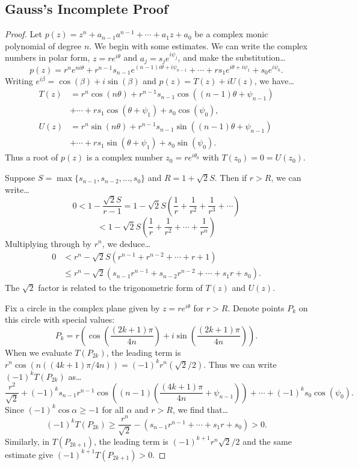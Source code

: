 \subsection{Gauss's Incomplete Proof}\label{gaussproofofFOA}

\begin{proof}
Let $p(z) = z^n + a_{n-1}a^{n-1} + \cdots + a_1z + a_0$ be a complex monic polynomial of degree $n$. We begin with some
estimates. We can write the complex numbers in polar form, $z = re^{i \theta}$ and $a_j = s_je^{i \psi_j}$, and make the substitution\dots
$$p(z) = r^ne^{ni \theta} + r^{n-1}s_{n-1}e^{(n-1)i \theta + i \psi_{n-1}} + \cdots + rs_1e^{i \theta + i \psi_1} + s_0e^{i \psi_0}.$$
Writing $e^{i \beta} = \cos(\beta) + i \sin(\beta)$ and $p(z) = T(z) + i U(z)$, we have\dots
\begin{align*}
T(z) &= r^n \cos(n \theta) + r^{n-1}s_{n-1} \cos((n-1)\theta + \psi_{n-1})\\
	 &+ \cdots + rs_1 \cos(\theta + \psi_1) + s_0 \cos (\psi_0),\\
U(z) &= r^n \sin(n \theta) + r^{n-1}s_{n-1} \sin((n-1)\theta + \psi_{n-1})\\
	 &+ \cdots + rs_1\sin(\theta + \psi_1) + s_0 \sin(\psi_0).
\end{align*}
Thus a root of $p(z)$ is a complex number $z_0 = re^{i\theta_0}$ with $T(z_0) = 0 = U(z_0)$.

Suppose $S = \max \{ s_{n-1}, s_{n-2}, \dots, s_0\}$ and $R = 1 + \sqrt{2}S$. Then if $r > R$, we can write\dots
$$0 < 1 - \frac{\sqrt{2}S}{r-1} = 1 -\sqrt{2}S\left(\frac{1}{r} + \frac{1}{r^2} + \frac{1}{r^3} + \cdots\right)$$
$$< 1 - \sqrt{2}S\left(\frac{1}{r} + \frac{1}{r^2} + \cdots + \frac{1}{r^n}\right)$$
Multiplying through by $r^n$, we deduce\dots
\begin{align*}
0 &< r^n - \sqrt{2}S(r^{n-1} + r^{n-2} + \cdots + r + 1)\\
  &\leq r^n - \sqrt{2}(s_{n-1}r^{n-1} + s_{n-2}r^{n-2} + \cdots + s_1r + s_0).
\end{align*}
The $\sqrt{2}$ factor is related to the trigonometric form of $T(z)$ and $U(z)$.

Fix a circle in the complex plane given by $z = re^{i \theta}$ for $r > R$. Denote points $P_k$ on this circle with special values:
$$P_k = r \left( \cos\left( \frac{(2k + 1) \pi}{4n}\right) + i \sin \left( \frac{(2k + 1) \pi}{4n} \right) \right).$$
When we evaluate $T(P_{2k})$, the leading term is $r^n \cos(n((4k+1)\pi/4n)) = (-1)^kr^n(\sqrt{2}/2)$. Thus we can write $(-1)^k T(P_{2k})$ as\dots
$$\frac{r^2}{\sqrt{2}} + (-1)^k s_{n-1} r^{n-1} \cos \left( (n-1) \left( \frac{(4k + 1)\pi}{4n} + \psi_{n-1} \right) \right) + \cdots + (-1)^ks_0\cos(\psi_0).$$
Since $(-1)^k \cos \alpha \geq -1$ for all $\alpha$ and $r > R$, we find that\dots
$$(-1)^kT(P_{2k}) \geq \frac{r^n}{\sqrt{2}} - (s_{n-1}r^{n-1} + \cdots + s_1 r + s_0) > 0.$$
Similarly, in $T(P_{2k+1})$, the leading term is $(-1)^{k+1}r^n \sqrt{2}/2$ and the same estimate give $(-1)^{k+1}T(P_{2k+1}) > 0$.


\end{proof}
